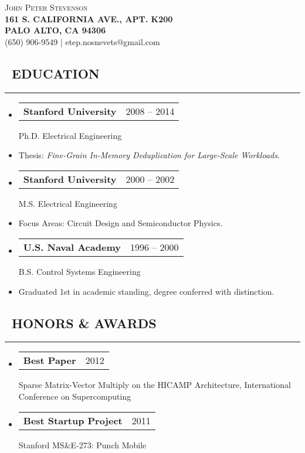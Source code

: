 \documentclass[10pt,letterpaper]{article}
\makeatletter
\newenvironment{resumesection}[1]
{%
    \subsection*{\ \textcolor{light-gray}{#1} }
    \vspace{-0.4em}
    \begin{samepage}
    \hrule
    \end{samepage}
    \vspace{+0.4em}
    \begin{itemize}[leftmargin=0.15cm]
        \parskip=0.1em
}%
{%
    \end{itemize}
}%
\newcommand{\headerrowx}[2]
{\item[] \begin{tabular*}{\linewidth}{l@{\extracolsep{\fill}}r}
	#1 &
	#2 \\
\end{tabular*}}
\newcommand{\lminiw}{0.375}
\makeatother
\begin{document}
\begin{center}
{\huge{ \textsc{ { {\selectfont John Peter} Stevenson}}}} \\
\vspace{0.5em}
\footnotesize{\textbf{161 S. CALIFORNIA AVE., APT. K200}}  \\
\footnotesize{\textbf{PALO ALTO, CA 94306              }}  \\
\footnotesize{{(650) 906-9549} | {etep.nosnevets@gmail.com}}
\end{center}

\begin{minipage}[t]{\lminiw\textwidth}
\begin{resumesection}{EDUCATION}
    \headerrowx{\textbf{Stanford University}}{2008 -- 2014}
    
    Ph.D. Electrical Engineering
    \item[] Thesis: \emph{Fine-Grain In-Memory Deduplication for Large-Scale Workloads}.
    
    \headerrowx{\textbf{Stanford University}}{2000 -- 2002}
    
    M.S. Electrical Engineering
    \item[] Focus Areas: Circuit Design and Semiconductor Physics.
    
    \headerrowx{\textbf{U.S. Naval Academy}}{1996 -- 2000}
    
    B.S. Control Systems Engineering
    \item[] Graduated 1st in academic standing, degree conferred with distinction.
\end{resumesection}

\begin{resumesection}{HONORS \& AWARDS}
    \headerrowx{\textbf{Best Paper}}{2012}
    
    Sparse Matrix-Vector Multiply on the {{HICAMP}} Architecture, International Conference on Supercomputing
    
    \headerrowx{\textbf{Best Startup Project}}{2011}
    
    Stanford MS\&E-273: Punch Mobile
    

\end{resumesection}
\end{minipage}
\end{document}
